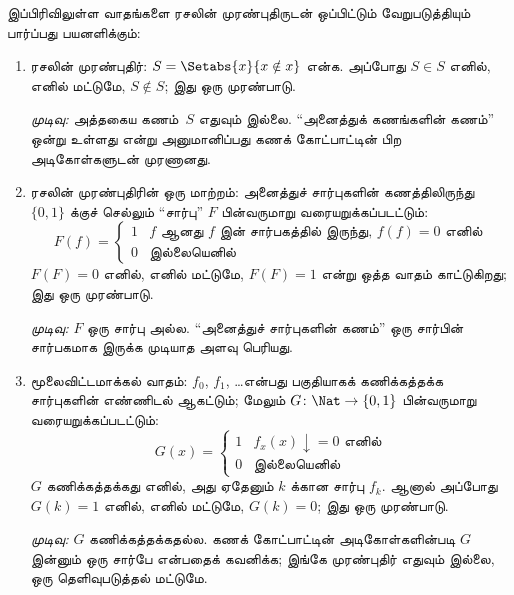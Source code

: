 \documentclass[../../../include/open-logic-section]{subfiles}
\begin{document}


இப்பிரிவிலுள்ள வாதங்களை ரசலின் முரண்புதிருடன் ஒப்பிட்டும்
வேறுபடுத்தியும் பார்ப்பது பயனளிக்கும்:
\begin{enumerate}
\item ரசலின் முரண்புதிர்: $S = \Setabs{x}{x \notin x}$ என்க.
அப்போது $S \in S$ எனில், எனில் மட்டுமே, $S \notin S$; இது ஒரு
முரண்பாடு.

  \emph{முடிவு:} அத்தகைய கணம்~$S$ எதுவும் இல்லை. “அனைத்துக்
  கணங்களின் கணம்” ஒன்று உள்ளது என்று அனுமானிப்பது கணக் கோட்பாட்டின்
  பிற அடிகோள்களுடன் முரணானது.

\item ரசலின் முரண்புதிரின் ஒரு மாற்றம்: அனைத்துச் சார்புகளின்
  கணத்திலிருந்து $\{ 0, 1 \}$ க்குச் செல்லும் “சார்பு” $F$
  பின்வருமாறு வரையறுக்கப்படட்டும்:
  \[
  F(f) =
  \begin{cases}
    1 & \text{$f$ ஆனது $f$ இன் சார்பகத்தில் இருந்து, $f(f) = 0$ எனில்} \\
    0 & \text{இல்லையெனில்}
  \end{cases}
  \]
  $F(F) = 0$ எனில், எனில் மட்டுமே, $F(F) = 1$ என்று ஒத்த
  வாதம் காட்டுகிறது; இது ஒரு முரண்பாடு.

  \emph{முடிவு:} $F$ ஒரு சார்பு அல்ல. “அனைத்துச் சார்புகளின் கணம்”
  ஒரு சார்பின் சார்பகமாக இருக்க முடியாத அளவு பெரியது.

\item மூலைவிட்டமாக்கல் வாதம்: $f_0$, $f_1$, \dots என்பது பகுதியாகக்
  கணிக்கத்தக்க சார்புகளின் எண்ணிடல் ஆகட்டும்; மேலும்
  $G \colon \Nat \to \{ 0, 1 \}$ பின்வருமாறு வரையறுக்கப்படட்டும்:
  \[
  G(x) =
  \begin{cases}
    1 & \text{$f_x(x)\downarrow = 0$ எனில்} \\
    0 & \text{இல்லையெனில்}
  \end{cases}
  \]
  $G$ கணிக்கத்தக்கது எனில், அது ஏதேனும் $k$ க்கான சார்பு $f_k$.
  ஆனால் அப்போது $G(k) = 1$ எனில், எனில் மட்டுமே, $G(k) = 0$;
  இது ஒரு முரண்பாடு.

  \emph{முடிவு:} $G$ கணிக்கத்தக்கதல்ல. கணக் கோட்பாட்டின்
  அடிகோள்களின்படி $G$ இன்னும் ஒரு சார்பே என்பதைக் கவனிக்க;
  இங்கே முரண்புதிர் எதுவும் இல்லை, ஒரு தெளிவுபடுத்தல் மட்டுமே.
\end{enumerate}
\end{document}
